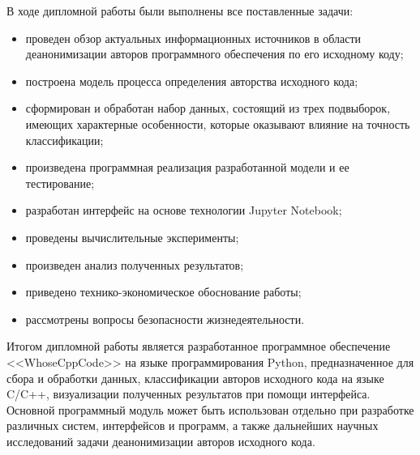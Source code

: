 В ходе дипломной работы были выполнены все поставленные задачи:
\begin{itemize}
 \item проведен обзор актуальных информационных источников в области деанонимизации
 авторов программного обеспечения по его исходному коду;
 \item построена модель процесса определения авторства исходного кода;
 \item сформирован и обработан набор данных, состоящий из трех подвыборок, имеющих характерные особенности,
 которые оказывают влияние на точность классификации;
 \item произведена программная реализация разработанной модели и ее тестирование;
 \item разработан интерфейс на основе технологии Jupyter Notebook;
 \item проведены вычислительные эксперименты;
 \item произведен анализ полученных результатов;
 \item приведено технико-экономическое обоснование работы;
 \item рассмотрены вопросы безопасности жизнедеятельности.
\end{itemize}

Итогом дипломной работы является разработанное программное обеспечение <<WhoseCppCode>> на языке
программирования Python, предназначенное для сбора и обработки данных,
классификации авторов исходного кода на языке C/C++,
визуализации полученных результатов при помощи интерфейса. Основной программный модуль может быть использован
отдельно при разработке различных систем, интерфейсов и программ, а также дальнейших
научных исследований задачи деанонимизации авторов исходного кода. 


